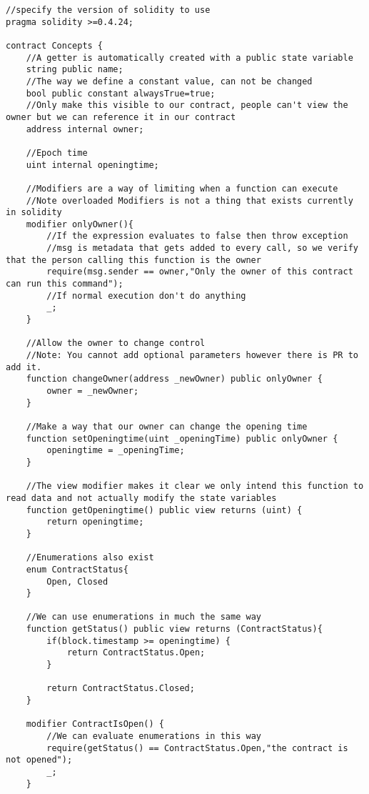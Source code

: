 \begin{lstlisting}[language=Solidity]
//specify the version of solidity to use
pragma solidity >=0.4.24;

contract Concepts {
    //A getter is automatically created with a public state variable
    string public name;
    //The way we define a constant value, can not be changed
    bool public constant alwaysTrue=true;
    //Only make this visible to our contract, people can't view the owner but we can reference it in our contract
    address internal owner;

    //Epoch time
    uint internal openingtime;

    //Modifiers are a way of limiting when a function can execute
    //Note overloaded Modifiers is not a thing that exists currently in solidity
    modifier onlyOwner(){
        //If the expression evaluates to false then throw exception
        //msg is metadata that gets added to every call, so we verify that the person calling this function is the owner
        require(msg.sender == owner,"Only the owner of this contract can run this command");
        //If normal execution don't do anything
        _;
    }

    //Allow the owner to change control
    //Note: You cannot add optional parameters however there is PR to add it.
    function changeOwner(address _newOwner) public onlyOwner {
        owner = _newOwner;
    }

    //Make a way that our owner can change the opening time
    function setOpeningtime(uint _openingTime) public onlyOwner {
        openingtime = _openingTime;
    }

    //The view modifier makes it clear we only intend this function to read data and not actually modify the state variables
    function getOpeningtime() public view returns (uint) {
        return openingtime;
    }

    //Enumerations also exist
    enum ContractStatus{
        Open, Closed
    }

    //We can use enumerations in much the same way
    function getStatus() public view returns (ContractStatus){
        if(block.timestamp >= openingtime) {
            return ContractStatus.Open;
        }

        return ContractStatus.Closed;
    }

    modifier ContractIsOpen() {
        //We can evaluate enumerations in this way
        require(getStatus() == ContractStatus.Open,"the contract is not opened");
        _;
    }


\end{lstlisting}

